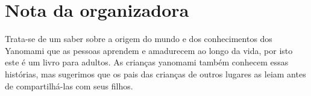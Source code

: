 \chapter{Nota da organizadora}


Trata-se de um saber sobre a origem do mundo e dos conhecimentos dos Yanomami que as pessoas aprendem e amadurecem ao longo da vida, por isto este é um livro para adultos. As crianças yanomami também conhecem essas histórias, mas sugerimos que os pais das crianças de outros lugares as leiam antes de compartilhá-las com seus filhos.
